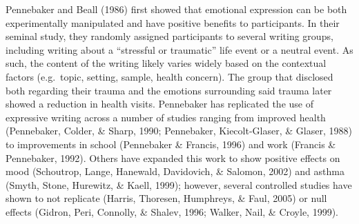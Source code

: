 \documentclass[english,man, mask]{apa6}
\theoremstyle{definition}
\theoremstyle{definition}
\theoremstyle{definition}
\theoremstyle{remark}
\begin{document}
Pennebaker and Beall (1986) first showed that emotional expression can
be both experimentally manipulated and have positive benefits to
participants. In their seminal study, they randomly assigned
participants to several writing groups, including writing about a
\enquote{stressful or traumatic} life event or a neutral event. As such,
the content of the writing likely varies widely based on the contextual
factors (e.g.~topic, setting, sample, health concern). The group that
disclosed both regarding their trauma and the emotions surrounding said
trauma later showed a reduction in health visits. Pennebaker has
replicated the use of expressive writing across a number of studies
ranging from improved health (Pennebaker, Colder, \& Sharp, 1990;
Pennebaker, Kiecolt-Glaser, \& Glaser, 1988) to improvements in school
(Pennebaker \& Francis, 1996) and work (Francis \& Pennebaker, 1992).
Others have expanded this work to show positive effects on mood
(Schoutrop, Lange, Hanewald, Davidovich, \& Salomon, 2002) and asthma
(Smyth, Stone, Hurewitz, \& Kaell, 1999); however, several controlled
studies have shown to not replicate (Harris, Thoresen, Humphreys, \&
Faul, 2005) or null effects (Gidron, Peri, Connolly, \& Shalev, 1996;
Walker, Nail, \& Croyle, 1999).
\end{document}
